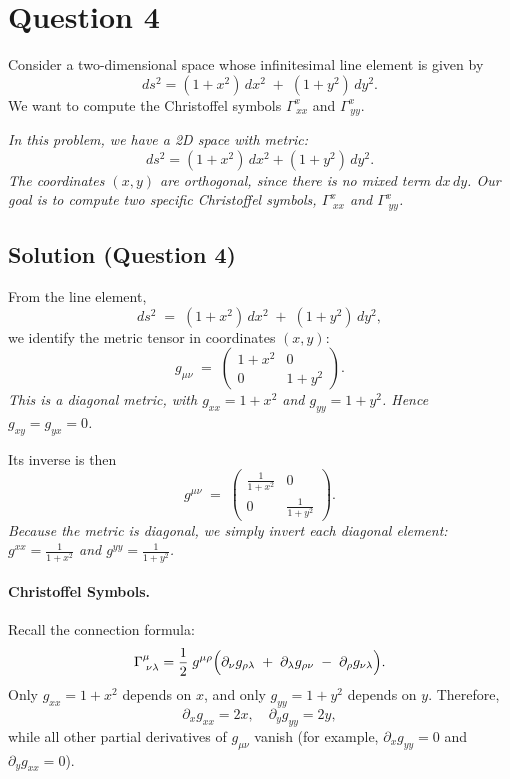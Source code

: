 \documentclass{article}
\begin{document}
\section*{Question 4}

\noindent
Consider a two-dimensional space whose infinitesimal line element is given by
\[
ds^2 = (1 + x^2)\,dx^2 \;+\; (1 + y^2)\,dy^2.
\]
We want to compute the Christoffel symbols \(\Gamma^{x}_{\,xx}\) and \(\Gamma^{x}_{\,yy}\).

\emph{In this problem, we have a 2D space with metric:
\[
ds^2 = (1 + x^2)\,dx^2 + (1 + y^2)\,dy^2.
\]
The coordinates \((x, y)\) are orthogonal, since there is no mixed term \(dx\,dy\). Our goal is to compute two specific Christoffel symbols, \(\Gamma^x_{\;xx}\) and \(\Gamma^x_{\;yy}\).}

\subsection*{Solution (Question 4)}

\noindent
From the line element,
\[
ds^2 \;=\; (1 + x^2)\,dx^2 \;+\; (1 + y^2)\,dy^2,
\]
we identify the metric tensor in coordinates \((x,y)\):
\[
g_{\mu\nu} \;=\;
\begin{pmatrix}
1 + x^2 & 0 \\
0 & 1 + y^2
\end{pmatrix}.
\]
\emph{This is a diagonal metric, with \(g_{xx} = 1 + x^2\) and \(g_{yy} = 1 + y^2\). Hence \(g_{xy} = g_{yx} = 0\).}

Its inverse is then
\[
g^{\mu\nu} \;=\;
\begin{pmatrix}
\frac{1}{1 + x^2} & 0 \\
0 & \frac{1}{1 + y^2}
\end{pmatrix}.
\]
\emph{Because the metric is diagonal, we simply invert each diagonal element: \(g^{xx} = \tfrac{1}{1+x^2}\) and \(g^{yy} = \tfrac{1}{1+y^2}\).}

\medskip

\paragraph{Christoffel Symbols.}
Recall the connection formula:
\[
\Gamma^{\mu}_{\;\nu\lambda}
=
\frac{1}{2}\;g^{\mu\rho}
\Bigl(
\partial_\nu g_{\rho\lambda}
\;+\;
\partial_\lambda g_{\rho\nu}
\;-\;
\partial_\rho g_{\nu\lambda}
\Bigr).
\]
Only \(g_{xx} = 1 + x^2\) depends on \(x\), and only \(g_{yy} = 1 + y^2\) depends on \(y\). Therefore,
\[
\partial_x g_{xx} = 2x,
\quad
\partial_y g_{yy} = 2y,
\]
while all other partial derivatives of \(g_{\mu\nu}\) vanish (for example, \(\partial_x g_{yy} = 0\) and \(\partial_y g_{xx} = 0\)).
\end{document}
